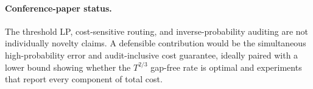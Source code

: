 \documentclass[11pt]{article}
\begin{document}
\paragraph{Conference-paper status.}
The threshold LP, cost-sensitive routing, and inverse-probability auditing are
not individually novelty claims.  A defensible contribution would be the
simultaneous high-probability error and audit-inclusive cost guarantee, ideally
paired with a lower bound showing whether the $T^{2/3}$ gap-free rate is
optimal and experiments that report every component of total cost.
\end{document}
